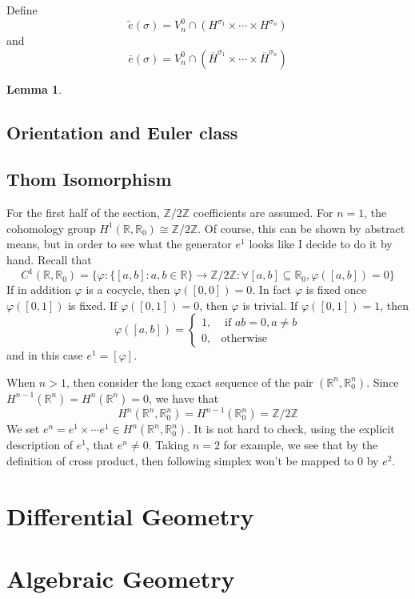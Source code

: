 \documentclass[12pt]{article}
\theoremstyle{plain}
\newtheorem{lemma}[equation]{Lemma}
\theoremstyle{definition}
\newcommand{\IR}{\mathbb{R}}
\newcommand{\IZ}{\mathbb{Z}}
\newcommand\iso{{\cong}}
\newcommand{\<}{\langle}
\renewcommand{\>}{\rangle}
\def\wt{\widetilde}
\newcommand{\wb}{\overline}
\begin{document}
Define $$\wt{e}(\sigma) = V_n^0 \cap (H^{\sigma_1} \times \cdots \times H^{\sigma_n})$$ and $$ \wb{e}(\sigma) = V_n^0 \cap (\wb{H}^{\sigma_1} \times \cdots \times \wb{H}^{\sigma_n})$$

\begin{lemma}
\end{lemma}

\subsection{Orientation and Euler class}

\subsection{Thom Isomorphism}
For the first half of the section, $\IZ/2\IZ$ coefficients are assumed.
For $n = 1$, the cohomology group $H^1(\IR, \IR_0) \iso \IZ/2\IZ$. Of course, this can be shown by abstract means, but in order to see what the generator $e^1$ looks like I decide to do it by hand. Recall that $$C^1(\IR, \IR_0)= \{ \varphi : \{ [a, b]: a, b \in \IR \} \to \IZ/2\IZ : \forall [a, b] \subseteq \IR_0, \varphi([a, b]) = 0 \}$$ If in addition $\varphi$ is a cocycle, then $\varphi([0, 0]) = 0$. In fact $\varphi$ is fixed once $\varphi([0, 1])$ is fixed. If $\varphi([0, 1]) = 0$, then $\varphi$ is trivial. If $\varphi([0, 1]) = 1$, then $$ \varphi([a, b]) = \begin{cases} 1, &\text{ if }ab = 0, a \neq b \\
 0,& \text{otherwise} \end{cases} $$ and in this case $e^1 = [\varphi]$. 

When $n > 1$, then consider the long exact sequence of the pair $(\IR^n, \IR^n_0)$. Since $H^{n - 1}(\IR^n) = H^n(\IR^n) = 0$, we have that $$H^n(\IR^n, \IR^n_0) = H^{n - 1}(\IR^n_0) = \IZ / 2\IZ$$ 
We set $e^n = e^1 \times \cdots e^1 \in H^n(\IR^n, \IR^n_0)$. It is not hard to check, using the explicit description of $e^1$, that $e^n \neq 0$. Taking $n = 2$ for example, we see that by the definition of cross product, then following simplex won't be mapped to $0$ by $e^2$. 




\section{Differential Geometry}

\section{Algebraic Geometry}
\end{document}
